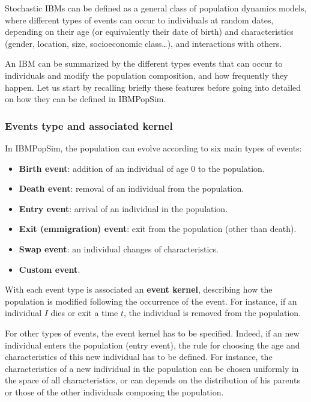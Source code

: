 Stochastic IBMs can be defined as a general class of population dynamics models, where different types of events can occur to individuals at random dates, depending on their age (or equivalently their date of birth) and characteristics (gender, location, size, socioeconomic class\ldots), and interactions with others.

An IBM can be summarized by the different types events that can occur to individuals and modify the population composition, and how frequently they happen. Let us start by recalling briefly these features before going into detailed on how they can be defined in IBMPopSim.

\hypertarget{eventsTh}{%
\subsubsection{Events type and associated kernel}\label{eventsTh}}

In IBMPopSim, the population can evolve according to six main types of events:

\begin{itemize}
\tightlist
\item
  \textbf{Birth event}: addition of an individual of age 0 to the population.
\item
  \textbf{Death event}: removal of an individual from the population.
\item
  \textbf{Entry event}: arrival of an individual in the population.
\item
  \textbf{Exit (emmigration) event}: exit from the population (other than death).
\item
  \textbf{Swap event}: an individual changes of characteristics.
\item
  \textbf{Custom event}.
\end{itemize}

With each event type is associated an \textbf{event kernel}, describing how the population is modified following the occurrence of the event. For instance, if an individual \(I\) dies or exit a time \(t\), the individual is removed from the population.

For other types of events, the event kernel has to be specified. Indeed, if an new individual enters the population (entry event), the rule for choosing the age and characteristics of this new individual has to be defined. For instance, the characteristics of a new individual in the population can be chosen uniformly in the space of all characteristics, or can depends on the distribution of his parents or those of the other individuals composing the population.

